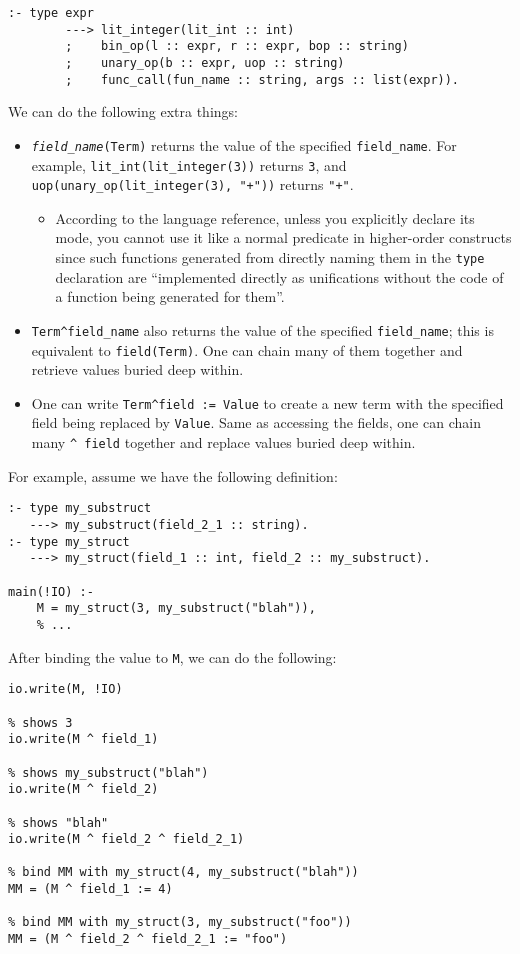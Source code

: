 \begin{lstlisting}[language=Mercury]
:- type expr
        ---> lit_integer(lit_int :: int)
        ;    bin_op(l :: expr, r :: expr, bop :: string)
        ;    unary_op(b :: expr, uop :: string)
        ;    func_call(fun_name :: string, args :: list(expr)).
\end{lstlisting}

  We can do the following extra things:

  \begin{itemize}
  \item \texttt{\textit{field_name}(Term)} returns the value of the specified \texttt{field_name}. For example, \texttt{lit_int(lit_integer(3))} returns \texttt{3}, and \texttt{uop(unary_op(lit_integer(3), "+"))} returns \texttt{"+"}.
    \begin{itemize}
    \item According to the language reference, unless you explicitly declare its mode, you cannot use it like a normal predicate in higher-order constructs since such functions generated from directly naming them in the \texttt{type} declaration are ``implemented directly as unifications without the code of a function being generated for them''.
    \end{itemize}
  \item \texttt{Term\;\textasciicircum\;field_name} also returns the value of the specified \texttt{field_name}; this is equivalent to \texttt{field(Term)}. One can chain many of them together and retrieve values buried deep within.
  \item One can write \texttt{Term\;\textasciicircum\;field := Value} to create a new term with the specified field being replaced by \texttt{Value}. Same as accessing the fields, one can chain many \texttt{^ field} together and replace values buried deep within.
  \end{itemize}

  For example, assume we have the following definition:
\begin{lstlisting}[language=Mercury]
:- type my_substruct
   ---> my_substruct(field_2_1 :: string).
:- type my_struct
   ---> my_struct(field_1 :: int, field_2 :: my_substruct).

main(!IO) :-
	M = my_struct(3, my_substruct("blah")),
    % ...
\end{lstlisting}

  After binding the value to \texttt{M}, we can do the following:

\begin{lstlisting}[language=Mercury]
% shows my_struct(3, my_substruct("blah"))
io.write(M, !IO)

% shows 3
io.write(M ^ field_1)

% shows my_substruct("blah")
io.write(M ^ field_2)

% shows "blah"
io.write(M ^ field_2 ^ field_2_1)

% bind MM with my_struct(4, my_substruct("blah"))
MM = (M ^ field_1 := 4)

% bind MM with my_struct(3, my_substruct("foo"))
MM = (M ^ field_2 ^ field_2_1 := "foo")
\end{lstlisting}

